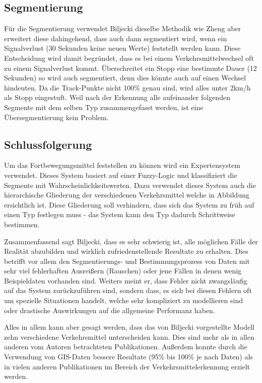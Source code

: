 \subsection{Segmentierung}
Für die Segmentierung verwendet Biljecki dieselbe Methodik wie Zheng aber erweitert diese dahingehend, dass auch dann segmentiert wird, wenn ein Signalverlust (30 Sekunden keine neuen Werte) feststellt werden kann. Diese Entscheidung wird damit begründet, dass es bei einem Verkehrsmittelwechsel oft zu einem Signalverlust kommt. 
Überschreitet ein Stopp eine bestimmte Dauer (12 Sekunden) so wird auch segmentiert, denn dies könnte auch auf einen Wechsel hindeuten. Da die Track-Punkte nicht 100\% genau sind, wird alles unter 2km/h als Stopp eingestuft. Weil nach der Erkennung alle aufeinander folgenden Segmente mit dem selben Typ zusammengefasst werden, ist eine Übersegmentierung kein Problem.

\subsection{Schlussfolgerung}
Um das Fortbewegungsmittel feststellen zu können wird ein Expertensystem verwendet. Dieses System basiert auf einer Fuzzy-Logic und klassifiziert die Segmente mit Wahrscheinlichkeitswerten. Dazu verwendet dieses System auch die hierarchische Gliederung der verschiedenen Verkehrsmittel welche in Abbildung  ersichtlich ist. Diese Gliederung soll verhindern, dass sich das System zu früh auf einen Typ festlegen muss - das System kann den Typ dadurch Schrittweise bestimmen.


Zusammenfassend sagt Biljecki, dass es sehr schwierig ist, alle möglichen Fälle der Realität abzubilden und wirklich zufriedenstellende Resultate zu erhalten. Dies betrifft vor allem den Segmentierungs- und Bestimmungsprozess von Daten mit sehr viel fehlerhaften Ausreißern (Rauschen) oder jene Fällen in denen wenig Beispieldaten vorhanden sind. Weiters meint er, dass Fehler nicht zwangsläufig auf das System zurückzuführen sind, sondern dass, es sich bei diesen Fehlern oft um spezielle Situationen handelt, welche sehr kompliziert zu modellieren sind oder drastische Auswirkungen auf die allgemeine Performanz haben.

Alles in allem kann aber gesagt werden, dass das von Biljecki vorgestellte Modell zehn verschiedene Verkehrsmittel unterscheiden kann. Dies sind mehr als in allen anderen vom Autoren betrachteten Publikationen. Außerdem konnte durch die Verwendung von GIS-Daten bessere Resultate (95\% bis 100\% je nach Daten) als in vielen anderen Publikationen im Bereich der Verkehrsmittelerkennung erzielt werden. 

